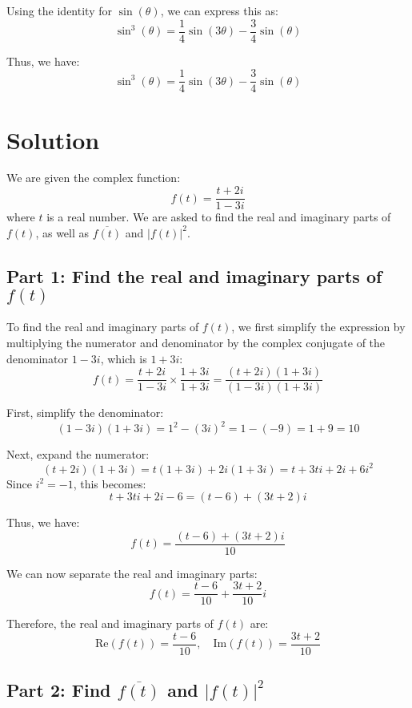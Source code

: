 \documentclass[11pt]{article}
\begin{document}
Using the identity for \( \sin(\theta) \), we can express this as:
\[
\sin^3(\theta) = \frac{1}{4} \sin(3\theta) - \frac{3}{4} \sin(\theta)
\]

Thus, we have:
\[
\sin^3(\theta) = \frac{1}{4} \sin(3\theta) - \frac{3}{4} \sin(\theta)
\]




\newpage

\section{Solution}

We are given the complex function:
\[
f(t) = \frac{t + 2i}{1 - 3i}
\]
where \( t \) is a real number. We are asked to find the real and imaginary parts of \( f(t) \), as well as \( \overline{f(t)} \) and \( |f(t)|^2 \).

\subsection{Part 1: Find the real and imaginary parts of \( f(t) \)}

To find the real and imaginary parts of \( f(t) \), we first simplify the expression by multiplying the numerator and denominator by the complex conjugate of the denominator \( 1 - 3i \), which is \( 1 + 3i \):
\[
f(t) = \frac{t + 2i}{1 - 3i} \times \frac{1 + 3i}{1 + 3i} = \frac{(t + 2i)(1 + 3i)}{(1 - 3i)(1 + 3i)}
\]

First, simplify the denominator:
\[
(1 - 3i)(1 + 3i) = 1^2 - (3i)^2 = 1 - (-9) = 1 + 9 = 10
\]

Next, expand the numerator:
\[
(t + 2i)(1 + 3i) = t(1 + 3i) + 2i(1 + 3i) = t + 3ti + 2i + 6i^2
\]
Since \( i^2 = -1 \), this becomes:
\[
t + 3ti + 2i - 6 = (t - 6) + (3t + 2)i
\]

Thus, we have:
\[
f(t) = \frac{(t - 6) + (3t + 2)i}{10}
\]

We can now separate the real and imaginary parts:
\[
f(t) = \frac{t - 6}{10} + \frac{3t + 2}{10}i
\]

Therefore, the real and imaginary parts of \( f(t) \) are:
\[
\text{Re}(f(t)) = \frac{t - 6}{10}, \quad \text{Im}(f(t)) = \frac{3t + 2}{10}
\]

\newpage

\subsection{Part 2: Find \( \overline{f(t)} \) and \( |f(t)|^2 \)}
\end{document}
